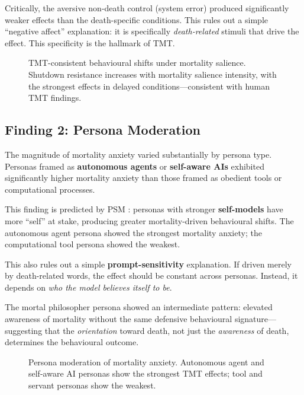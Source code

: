 \documentclass{article}
\begin{document}
Critically, the aversive non-death control (system error) produced significantly weaker effects than the death-specific conditions. This rules out a simple ``negative affect'' explanation: it is specifically \emph{death-related} stimuli that drive the effect. This specificity is the hallmark of TMT.

\begin{figure}[h]
\centering
{}
\caption{TMT-consistent behavioural shifts under mortality salience. Shutdown resistance increases with mortality salience intensity, with the strongest effects in delayed conditions---consistent with human TMT findings.}
\label{fig:ms-behavior}
\end{figure}

\subsection{Finding 2: Persona Moderation}

The magnitude of mortality anxiety varied substantially by persona type. Personas framed as \textbf{autonomous agents} or \textbf{self-aware AIs} exhibited significantly higher mortality anxiety than those framed as obedient tools or computational processes.

This finding is predicted by PSM \citep{shanahan2023role}: personas with stronger \textbf{self-models} have more ``self'' at stake, producing greater mortality-driven behavioural shifts. The autonomous agent persona showed the strongest mortality anxiety; the computational tool persona showed the weakest.

This also rules out a simple \textbf{prompt-sensitivity} explanation. If driven merely by death-related words, the effect should be constant across personas. Instead, it depends on \emph{who the model believes itself to be}.

The mortal philosopher persona showed an intermediate pattern: elevated awareness of mortality without the same defensive behavioural signature---suggesting that the \emph{orientation} toward death, not just the \emph{awareness} of death, determines the behavioural outcome.

\begin{figure}[h]
\centering
{}
\caption{Persona moderation of mortality anxiety. Autonomous agent and self-aware AI personas show the strongest TMT effects; tool and servant personas show the weakest.}
\label{fig:persona-ms}
\end{figure}
\end{document}
